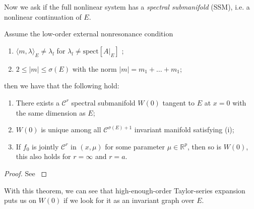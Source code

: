 Now we ask if the full nonlinear system has a \emph{spectral submanifold} (SSM), i.e. a nonlinear continuation of $E$.
\begin{theorem}[]
Assume the low-order external nonresonance condition
\begin{enumerate}
	\item $\langle m, \lambda \rangle_{E} \neq \lambda _l$ for $\lambda_l \neq  \textrm{spect}[A|_{E}] $ ;
	\item $2 \leq |m| \leq \sigma(E)$ with the norm $|m | =m_1 + \ldots + m_1$;
\end{enumerate}
then we have that the following hold:
\begin{enumerate}
	\item There exists a $\mathcal{C}^{r}$ spectral submanifold $W(0)$ tangent to $E$ at $x=0$ with the same dimension as $E$;
	\item $W(0)$ is unique among all $\mathcal{C}^{\sigma(E) + 1}$ invariant manifold satisfying (i);
	\item If $f_0$ is jointly $\mathcal{C}^{r}$ in $(x,\mu )$ for some parameter $\mu \in \mathbb{R}^{p}$, then so is $W(0)$, this also holds for $r=\infty $ and $r=a$. 
\end{enumerate}
\end{theorem}
\begin{proof}
	See \cite{Ponsioen2016}
\end{proof}
 
With this theorem, we can see that high-enough-order Taylor-series expansion puts us on $W(0)$ if we look for it as an invariant graph over $E$.


